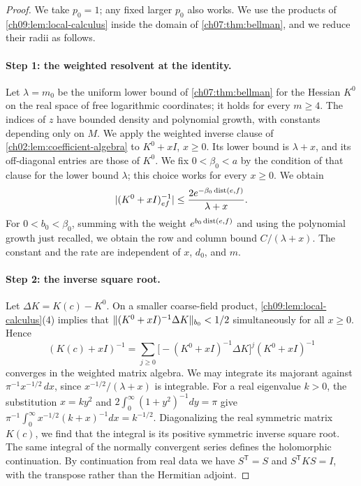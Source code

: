 \begin{proof}
We take $p_0=1$; any fixed larger $p_0$ also works. We use the products of \cref{ch09:lem:local-calculus} inside the domain of \cref{ch07:thm:bellman}, and we reduce their radii as follows.

\paragraph{Step 1: the weighted resolvent at the identity.}
Let $\lambda=m_0$ be the uniform lower bound of \cref{ch07:thm:bellman} for the Hessian $K^0$ on the real space of free logarithmic coordinates; it holds for every $m\ge4$. The indices of $z$ have bounded density and polynomial growth, with constants depending only on $M$. We apply the weighted inverse clause of \cref{ch02:lem:coefficient-algebra} to $K^0+xI$, $x\ge0$. Its lower bound is $\lambda+x$, and its off-diagonal entries are those of $K^0$. We fix $0<\beta_0<a$ by the condition of that clause for the lower bound $\lambda$; this choice works for every $x\ge0$. We obtain
\[
 \lvert (K^0+xI)^{-1}_{ef}\rvert\le\frac{2e^{-\beta_0\operatorname{dist}(e,f)}}{\lambda+x}.
\]
For $0<b_0<\beta_0$, summing with the weight $e^{b_0\operatorname{dist}(e,f)}$ and using the polynomial growth just recalled, we obtain the row and column bound $C/(\lambda+x)$. The constant and the rate are independent of $x$, $d_0$, and $m$.

\paragraph{Step 2: the inverse square root.}
Let $\Delta K=K(c)-K^0$. On a smaller coarse-field product, \cref{ch09:lem:local-calculus}(4) implies that $\lVert (K^0+xI)^{-1}\Delta K\rVert_{b_0}<1/2$ simultaneously for all $x\ge0$. Hence
\begin{equation}\label{ch09:eq:resolvent-series}
 (K(c)+xI)^{-1}=\sum_{j\ge0}\bigl[-(K^0+xI)^{-1}\Delta K\bigr]^j(K^0+xI)^{-1}
\end{equation}
converges in the weighted matrix algebra. We may integrate its majorant against $\pi^{-1}x^{-1/2}\,dx$, since $x^{-1/2}/(\lambda+x)$ is integrable. For a real eigenvalue $k>0$, the substitution $x=ky^2$ and $2\int_0^\infty(1+y^2)^{-1}dy=\pi$ give $\pi^{-1}\int_0^\infty x^{-1/2}(k+x)^{-1}dx=k^{-1/2}$. Diagonalizing the real symmetric matrix $K(c)$, we find that the integral is its positive symmetric inverse square root. The same integral of the normally convergent series defines the holomorphic continuation. By continuation from real data we have $S^{\mathsf T}=S$ and $S^{\mathsf T}KS=I$, with the transpose rather than the Hermitian adjoint.


\end{proof}
